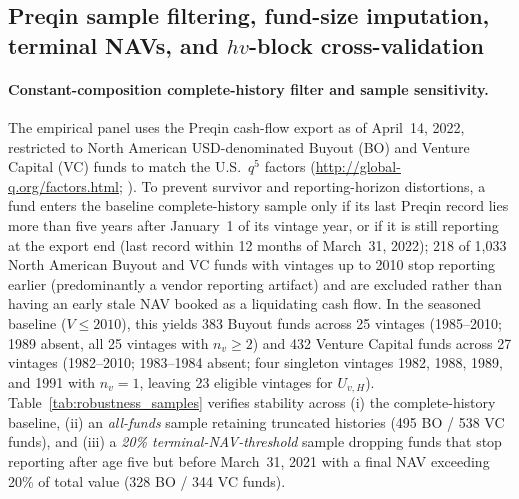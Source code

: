 \subsection{Preqin sample filtering, fund-size imputation, terminal NAVs, and $hv$-block cross-validation}
\label{sec:appendix_data_engineering}

\paragraph{Constant-composition complete-history filter and sample sensitivity.}
The empirical panel uses the Preqin cash-flow export as of April~14, 2022, restricted to North American USD-denominated Buyout (BO) and Venture Capital (VC) funds to match the U.S.\ $q^5$ factors (\url{http://global-q.org/factors.html}; \citealp{HXZ15,hou2021augmented}).
To prevent survivor and reporting-horizon distortions, a fund enters the baseline complete-history sample only if its last Preqin record lies more than five years after January~1 of its vintage year, or if it is still reporting at the export end (last record within 12 months of March~31, 2022); 218 of 1{,}033 North American Buyout and VC funds with vintages up to 2010 stop reporting earlier (predominantly a vendor reporting artifact) and are excluded rather than having an early stale NAV booked as a liquidating cash flow.
In the seasoned baseline ($V \le 2010$), this yields 383 Buyout funds across 25 vintages (1985--2010; 1989 absent, all 25 vintages with $n_v \ge 2$) and 432 Venture Capital funds across 27 vintages (1982--2010; 1983--1984 absent; four singleton vintages 1982, 1988, 1989, and 1991 with $n_v=1$, leaving 23 eligible vintages for $U_{v,H}$).
Table~\ref{tab:robustness_samples} verifies stability across (i) the complete-history baseline, (ii) an \emph{all-funds} sample retaining truncated histories (495 BO / 538 VC funds), and (iii) a \emph{20\% terminal-NAV-threshold} sample dropping funds that stop reporting after age five but before March~31, 2021 with a final NAV exceeding 20\% of total value (328 BO / 344 VC funds).

